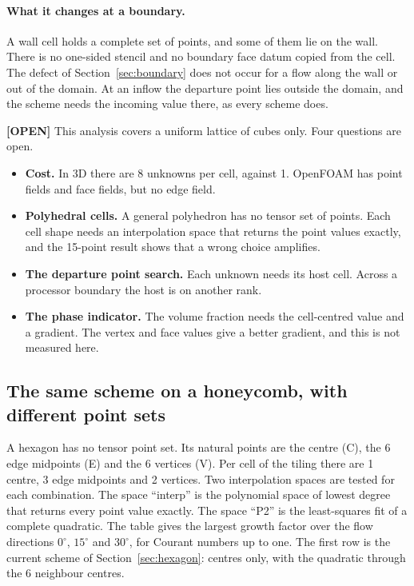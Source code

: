 \documentclass[11pt,a4paper]{article}
\newcommand{\opn}{\textcolor{orange!80!black}{\textbf{[OPEN]}}}
\begin{document}
\paragraph{What it changes at a boundary.} A wall cell holds a complete set of points, and some
of them lie on the wall. There is no one-sided stencil and no boundary face datum copied from
the cell. The defect of Section~\ref{sec:boundary} does not occur for a flow along the wall or
out of the domain. At an inflow the departure point lies outside the domain, and the scheme
needs the incoming value there, as every scheme does.

\opn{} This analysis covers a uniform lattice of cubes only. Four questions are open.
\begin{itemize}
\item \textbf{Cost.} In 3D there are 8 unknowns per cell, against 1. OpenFOAM has point fields
      and face fields, but no edge field.
\item \textbf{Polyhedral cells.} A general polyhedron has no tensor set of points. Each cell
      shape needs an interpolation space that returns the point values exactly, and the
      15-point result shows that a wrong choice amplifies.
\item \textbf{The departure point search.} Each unknown needs its host cell. Across a processor
      boundary the host is on another rank.
\item \textbf{The phase indicator.} The volume fraction needs the cell-centred value and a
      gradient. The vertex and face values give a better gradient, and this is not measured
      here.
\end{itemize}

\subsection{The same scheme on a honeycomb, with different point sets}
\label{sec:multipointhex}

A hexagon has no tensor point set. Its natural points are the centre (C), the 6 edge midpoints
(E) and the 6 vertices (V). Per cell of the tiling there are 1 centre, 3 edge midpoints and
2 vertices. Two interpolation spaces are tested for each combination. The space ``interp'' is
the polynomial space of lowest degree that returns every point value exactly. The space ``P2''
is the least-squares fit of a complete quadratic. The table gives the largest growth factor over
the flow directions \(0^\circ\), \(15^\circ\) and \(30^\circ\), for Courant numbers up to one.
The first row is the current scheme of Section~\ref{sec:hexagon}: centres only, with the
quadratic through the 6 neighbour centres.
\end{document}
